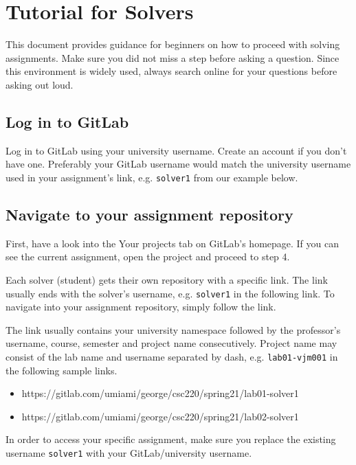 \chapter{Tutorial for Solvers} \label{app:tut-sol}

{This document provides guidance for beginners on how to proceed with solving assignments. Make sure you did not miss a step before asking a question. Since this environment is widely used, always search online for your questions before asking out loud.}

\section{Log in to GitLab}\label{sec:login}

{Log in to GitLab using your university username. Create an account if you don't have one. Preferably your GitLab username would match the university username used in your assignment's link, e.g. \texttt{solver1} from our example below.}

\section{Navigate to your assignment repository}\label{sec:navig}

{First, have a look into the Your projects tab on GitLab's homepage. If you can see the current assignment, open the project and proceed to step 4.}

{Each solver (student) gets their own repository with a specific link. The link usually ends with the solver's username, e.g. \texttt{solver1} in the following link. To navigate into your assignment repository, simply follow the link.}

{The link usually contains your university namespace followed by the professor's username, course, semester and project name consecutively. Project name may consist of the lab name and username separated by dash, e.g. \texttt{lab01-vjm001} in the following sample links.}

\begin{itemize}
\item
  {https://gitlab.com/umiami/george/csc220/spring21/lab01-solver1}
\item
  {https://gitlab.com/umiami/george/csc220/spring21/lab02-solver1}
\end{itemize}

{In order to access your specific assignment, make sure you replace the existing username \texttt{solver1} with your GitLab/university username.}


